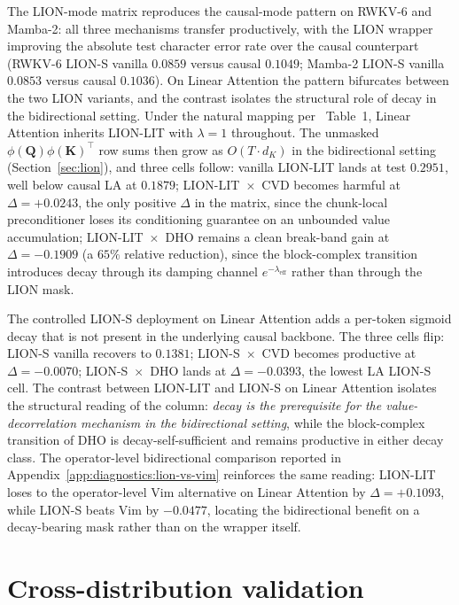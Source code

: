 The LION-mode matrix reproduces the causal-mode pattern on
RWKV-6 and Mamba-2: all three mechanisms transfer productively,
with the LION wrapper improving the absolute test character
error rate over the causal counterpart (RWKV-6 LION-S vanilla
$0.0859$ versus causal $0.1049$; Mamba-2 LION-S vanilla $0.0853$
versus causal $0.1036$). On Linear Attention the pattern
bifurcates between the two LION variants, and the contrast
isolates the structural role of decay in the bidirectional
setting.
Under the natural mapping per~\citet{afzal2025linear} Table~1,
Linear Attention inherits LION-LIT with $\lambda = 1$
throughout. The unmasked
$\phi(\mathbf{Q}) \phi(\mathbf{K})^{\top}$ row sums then grow
as $O(T \cdot d_{K})$ in the bidirectional setting
(Section~\ref{sec:lion}), and three cells follow: vanilla
LION-LIT lands at test $0.2951$, well below causal LA at
$0.1879$; LION-LIT~$\times$~CVD becomes harmful at
$\Delta = +0.0243$, the only positive $\Delta$ in the matrix,
since the chunk-local preconditioner loses its conditioning
guarantee on an unbounded value accumulation;
LION-LIT~$\times$~DHO remains a clean break-band gain at
$\Delta = -0.1909$ (a $65\%$ relative reduction), since the
block-complex transition introduces decay through its damping
channel $e^{-\lambda_{\mathrm{eff}}}$ rather than through the
LION mask.

The controlled LION-S deployment on Linear Attention adds a
per-token sigmoid decay that is not present in the underlying
causal backbone. The three cells flip: LION-S vanilla recovers
to $0.1381$; LION-S~$\times$~CVD becomes productive at
$\Delta = -0.0070$; LION-S~$\times$~DHO lands at
$\Delta = -0.0393$, the lowest LA LION-S cell. The contrast
between LION-LIT and LION-S on Linear Attention isolates the
structural reading of the column: \textit{decay is the
prerequisite for the value-decorrelation mechanism in the
bidirectional setting}, while the block-complex transition of
DHO is decay-self-sufficient and remains productive in either
decay class. The operator-level bidirectional comparison
reported in Appendix~\ref{app:diagnostics:lion-vs-vim}
reinforces the same reading: LION-LIT loses to the
operator-level Vim alternative on Linear Attention by
$\Delta = +0.1093$, while LION-S beats Vim by $-0.0477$,
locating the bidirectional benefit on a decay-bearing mask
rather than on the wrapper itself.

\section{Cross-distribution validation}\label{sec:experiments:cv}

